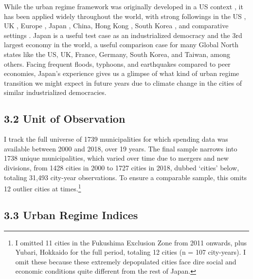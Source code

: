 \documentclass[preprint, 3p,
authoryear]{elsarticle} %
\begin{document}
While the urban regime framework was originally developed in a US
context \citep{stone_1989}, it has been applied widely throughout the
world, with strong followings in the US \citep{kilburn_2004}, UK
\citep{bassett_1996, davies_2017}, Europe
\citep{stoker_and_mossberger_1994, arbaci_2019}, Japan
\citep{hill_fujita_2000, saito_2003, sorensen_et_al_2010, tsukamoto_2012},
China, Hong Kong \citep{lai_and_chui_2014}, South Korea
\citep{shin_et_al_2015}, and comparative settings
\citep{mossberger_and_stoker_2001, ramirez_perez_et_al_2008}. Japan is a
useful test case as an industrialized democracy and the 3rd largest
economy in the world, a useful comparison case for many Global North
states like the US, UK, France, Germany, South Korea, and Taiwan, among
others. Facing frequent floods, typhoons, and earthquakes compared to
peer economies, Japan's experience gives us a glimpse of what kind of
urban regime transition we might expect in future years due to climate
change in the cities of similar industrialized democracies.

\hypertarget{unit-of-observation}{%
\subsection{3.2 Unit of Observation}\label{unit-of-observation}}

I track the full universe of 1739 municipalities for which spending data
was available between 2000 and 2018, over 19 years. The final sample
narrows into 1738 unique municipalities, which varied over time due to
mergers and new divisions, from 1428 cities in 2000 to 1727 cities in
2018, dubbed `cities' below, totaling 31,493 city-year observations. To
ensure a comparable sample, this omits 12 outlier cities at
times.\footnote{I omitted 11 cities in the Fukushima Exclusion Zone from
  2011 onwards, plus Yubari, Hokkaido for the full period, totaling 12
  cities (n = 107 city-years). I omit these because these extremely
  depopulated cities face dire social and economic conditions quite
  different from the rest of Japan.}

\hypertarget{urban-regime-indices}{%
\subsection{3.3 Urban Regime Indices}\label{urban-regime-indices}}
\end{document}
